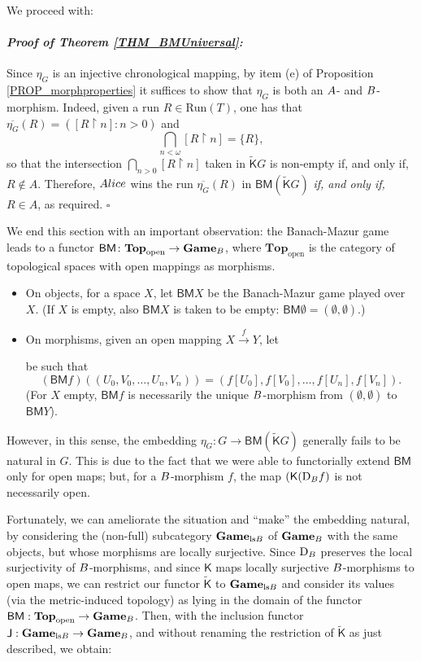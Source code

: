 \documentclass[12pt]{amsart}
\theoremstyle{definition}
\newenvironment{myproof}[2] {\paragraph{\it Proof of {#1} {\ref{#2}}:}}{\hfill$\square$}
\newcommand{\seq}[1]{{\left( {#1} \right)}}
\newcommand{\ali}{\textup{\textmd{\textsc{Alice}}}}
\newcommand{\A}{\textup{\textmd{\textsc{A}}}}
\newcommand{\B}{\textup{\textmd{\textsc{B}}}}
\newcommand{\Run}{{\mathrm{Run}}}
\newcommand{\K}{\mathsf{K}}
\newcommand{\D}{\mathrm{D}}
\newcommand{\CTop}{\mathbf{Top}}
\newcommand{\BM}{\mathsf{B}\mathsf{M}}
\newcommand{\Games}{\mathbf{Game}}
\begin{document}
We proceed with:



\begin{myproof}{Theorem}{THM_BMUniversal}
	Since  $\eta_G$ is an injective chronological mapping, 
	by item (e) of Proposition \ref{PROP_morphproperties} it suffices to show that $\eta_G$ is both an $\A$- and $\B$-morphism.
	Indeed, given a run $R\in \Run(T)$, one has that $\overline{\eta_G}(R) = \seq{[R\upharpoonright n]:n>0}$ and
	\[
	\bigcap_{n<\omega}[R\upharpoonright n]=\{R\},
	\]
	so that the intersection $\bigcap_{n>0}[R\upharpoonright n]$ taken in $\tilde{\K}G$ is non-empty if, and only if, $R\not\in A$. Therefore, $\ali$ wins the run $\overline{\eta_G}(R)$ in $\BM(\tilde{\K}G)$ \emph{if, and only if,} $R\in A$, as required.
\end{myproof}

We end this section with an important observation: the Banach-Mazur game leads to a functor $\BM\colon \CTop_{\mathrm{open}}\to \Games_{\B}$, where $\CTop_{\mathrm{open}}$ is the category of topological spaces with open mappings as morphisms. 
\begin{itemize}
	\item On objects, for a space $X$, let $\BM X$ be the Banach-Mazur game played over $X$. (If $X$ is empty, also $\BM X$ is taken to be empty: $\BM \emptyset=(\emptyset,\emptyset)$.)
	\item On morphisms, given an open mapping $X\stackrel{f}{\to}Y$, let  be such that 
	\[(\BM f)(\seq{U_0, V_0, \dotsc, U_n, V_n}) = \seq{f[U_0], f[V_0], \dotsc, f[U_n], f[V_n]}.\]
	(For $X$ empty, $\BM f$ is necessarily the unique $\B$-morphism from $(\emptyset,\emptyset)$ to $\BM Y$).
\end{itemize} 
However, in this sense, the embedding $\eta_G:G\to\mathsf{BM}(\tilde{\mathsf K}G)$ generally fails to be natural in $G$. This is due to the fact that we were able to functorially extend $\mathsf{BM}$ only for open maps; but, for a $\B$-morphism $f$,
the map $(\K( \D_{\B}f)$ is not necessarily open.

Fortunately, we can ameliorate the situation and ``make'' the embedding natural, by considering the (non-full) subcategory $\Games_{\mathrm{ls}\B}$  of $\Games_{\B}$ with the same objects, but whose morphisms are locally surjective. Since $\D_{\B}$ preserves the local surjectivity of $\B$-morphisms, and since $\K$ maps locally surjective $\B$-morphisms to open maps, we can restrict our functor $\tilde{\mathsf K}$ to $\Games_{\mathrm{ls}\B}$ and consider its values (via the metric-induced topology) as lying in the domain of the functor $\BM:\CTop_{\mathrm{open}}\to\Games_{\B}$. Then, with the inclusion functor $\mathsf J: \Games_{\mathrm{ls}\B}\to \Games_\B$, and without renaming the restriction of $\tilde{\mathsf K}$ as just described, we obtain:
\end{document}
